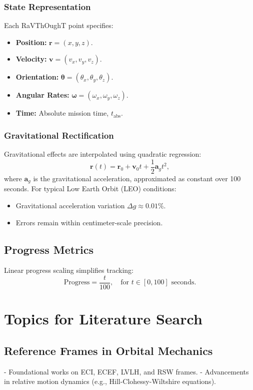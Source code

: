 \subsubsection{State Representation}
Each RaVThOughT point specifies:
\begin{itemize}
  \item \textbf{Position:} \(\mathbf{r} = (x, y, z)\).
  \item \textbf{Velocity:} \(\mathbf{v} = (v_x, v_y, v_z)\).
  \item \textbf{Orientation:} \(\boldsymbol{\theta} = (\theta_x, \theta_y, \theta_z)\).
  \item \textbf{Angular Rates:} \(\boldsymbol{\omega} = (\omega_x, \omega_y, \omega_z)\).
  \item \textbf{Time:} Absolute mission time, \(t_{\text{abs}}\).
\end{itemize}

\subsubsection{Gravitational Rectification}
Gravitational effects are interpolated using quadratic regression:
\[
\mathbf{r}(t) = \mathbf{r}_0 + \mathbf{v}_0 t + \frac{1}{2} \mathbf{a}_g t^2,
\]
where \(\mathbf{a}_g\) is the gravitational acceleration, approximated as constant over 100 seconds. For typical Low Earth Orbit (LEO) conditions:
\begin{itemize}
  \item Gravitational acceleration variation \(\Delta g \approx 0.01\%\).
  \item Errors remain within centimeter-scale precision.
\end{itemize}

\subsection{Progress Metrics}
Linear progress scaling simplifies tracking:
\[
\text{Progress} = \frac{t}{100}, \quad \text{for } t \in [0, 100] \text{ seconds}.
\]

\section{Topics for Literature Search}

\subsection{Reference Frames in Orbital Mechanics}
- Foundational works on ECI, ECEF, LVLH, and RSW frames.
- Advancements in relative motion dynamics (e.g., Hill-Clohessy-Wiltshire equations).

